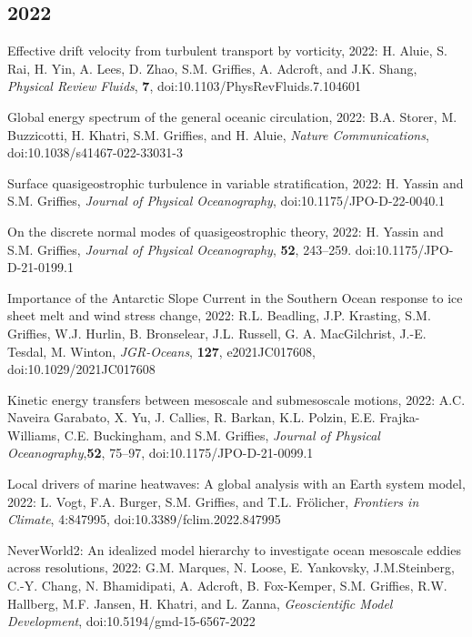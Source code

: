 \begin{etaremune}
\subsection*{\sc \color{Maroon} 2022}

\item Effective drift velocity from turbulent transport by vorticity, 2022: H. Aluie, S. Rai, H. Yin, A. Lees, D. Zhao, S.M. Grif\/f\/ies, A. Adcroft, and J.K. Shang, {\it  Physical Review Fluids}, {\bf 7}, doi:10.1103/PhysRevFluids.7.104601

\item Global energy spectrum of the general oceanic circulation, 2022: B.A. Storer, M. Buzzicotti, H. Khatri, S.M. Grif\/f\/ies, and H. Aluie, {\it Nature Communications}, 
doi:10.1038/s41467-022-33031-3



\item Surface quasigeostrophic turbulence in variable stratification, 2022: H. Yassin and S.M. Grif\/f\/ies,  {\it Journal of Physical Oceanography}, doi:10.1175/JPO-D-22-0040.1

\item On the discrete normal modes of quasigeostrophic theory, 2022: H. Yassin and S.M. Grif\/f\/ies,  {\it Journal of Physical Oceanography}, {\bf 52}, 243--259.  doi:10.1175/JPO-D-21-0199.1

\item Importance of the Antarctic Slope Current in the Southern Ocean response to ice sheet melt and wind stress change, 2022: R.L. Beadling, J.P. Krasting, S.M. Grif\/f\/ies, W.J. Hurlin, B. Bronselear, J.L. Russell, G. A. MacGilchrist, J.-E. Tesdal, M. Winton, {\it JGR-Oceans}, {\bf 127}, e2021JC017608, doi:10.1029/2021JC017608

\item Kinetic energy transfers between mesoscale and submesoscale motions, 2022: A.C. Naveira Garabato, X. Yu, J. Callies, R. Barkan, K.L. Polzin, E.E. Frajka-Williams, C.E. Buckingham, and S.M. Grif\/f\/ies, {\it Journal of Physical Oceanography},{\bf 52}, 75--97, doi:10.1175/JPO-D-21-0099.1

\item Local drivers of marine heatwaves: A global analysis with an Earth system model, 2022: L. Vogt, F.A. Burger, S.M. Grif\/f\/ies, and T.L. {Fr\"{o}licher}, {\it Frontiers in Climate}, 4:847995, doi:10.3389/fclim.2022.847995

\item NeverWorld2: An idealized model hierarchy to investigate ocean mesoscale eddies across resolutions, 2022: G.M. Marques, N. Loose, E. Yankovsky, J.M.Steinberg, C.-Y. Chang, N. Bhamidipati, A. Adcroft, B. Fox-Kemper, S.M. Griffies, R.W. Hallberg, M.F. Jansen, H. Khatri, and L. Zanna, {\it Geoscientific Model Development}, doi:10.5194/gmd-15-6567-2022


\end{etaremune}
